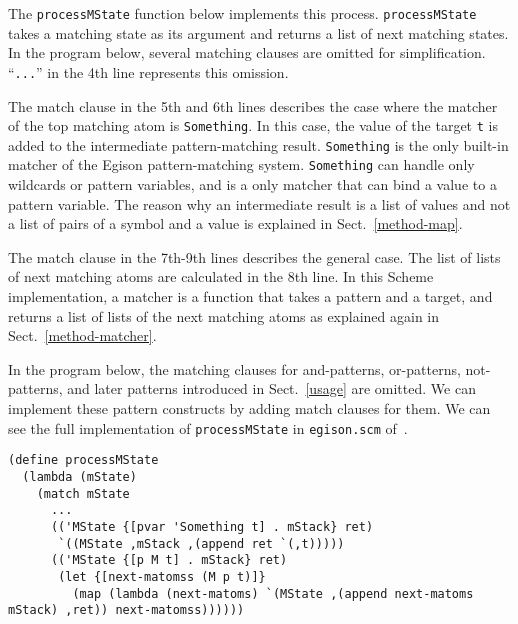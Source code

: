 \documentclass[acmlarge]{acmart}
\begin{document}
\medskip

The \texttt{processMState} function below implements this process.
\texttt{processMState} takes a matching state as its argument and returns a list of next matching states.
In the program below, several matching clauses are omitted for simplification.
``\texttt{...}'' in the 4th line represents this omission.

The match clause in the 5th and 6th lines describes the case where the matcher of the top matching atom is \texttt{Something}.
In this case, the value of the target \texttt{t} is added to the intermediate pattern-matching result.
\texttt{Something} is the only built-in matcher of the Egison pattern-matching system.
\texttt{Something} can handle only wildcards or pattern variables, and is a only matcher that can bind a value to a pattern variable.
The reason why an intermediate result is a list of values and not a list of pairs of a symbol and a value is explained in Sect.~\ref{method-map}.

The match clause in the 7th-9th lines describes the general case.
The list of lists of next matching atoms are calculated in the 8th line.
In this Scheme implementation, a matcher is a function that takes a pattern and a target, and returns a list of lists of the next matching atoms as explained again in Sect.~\ref{method-matcher}.

In the program below, the matching clauses for and-patterns, or-patterns, not-patterns, and later patterns introduced in Sect.~\ref{usage} are omitted.
We can implement these pattern constructs by adding match clauses for them.
We can see the full implementation of \texttt{processMState} in \texttt{egison.scm} of~\cite{egisonScheme}.

\begin{lstlisting}[language=egison]
(define processMState
  (lambda (mState)
    (match mState
      ...
      (('MState {[pvar 'Something t] . mStack} ret)
       `((MState ,mStack ,(append ret `(,t)))))
      (('MState {[p M t] . mStack} ret)
       (let {[next-matomss (M p t)]}
         (map (lambda (next-matoms) `(MState ,(append next-matoms mStack) ,ret)) next-matomss))))))
\end{lstlisting}

\medskip
\end{document}
